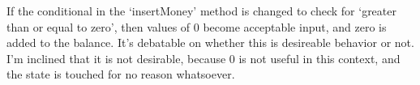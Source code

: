 If the conditional in the `insertMoney' method is changed to check for
`greater than or equal to zero', then values of 0 become acceptable
input, and zero is added to the balance. It's debatable on whether this
is desireable behavior or not. I'm inclined that it is not desirable,
because 0 is not useful in this context, and the state is touched for no
reason whatsoever.
